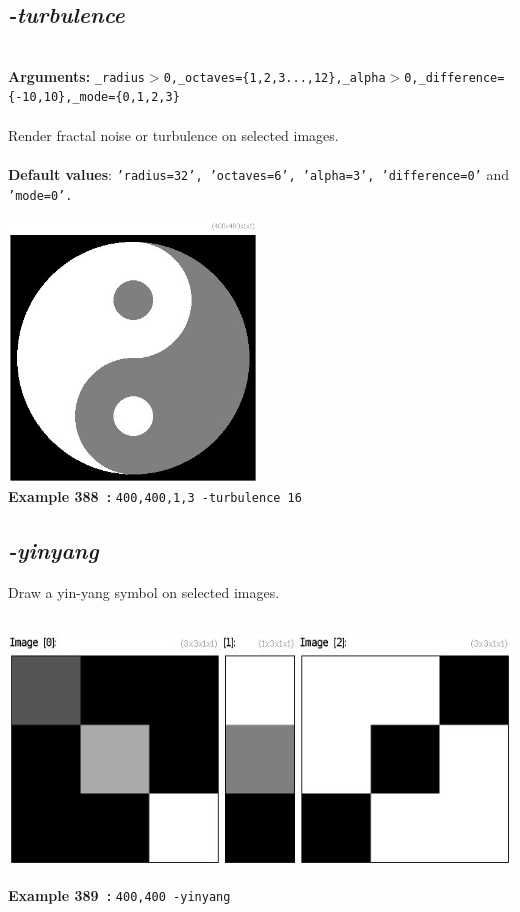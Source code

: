 \documentclass[a4paper,11pt,twoside]{book}
\begin{document}
\subsection{\emph{-turbulence} }\vspace*{-0.5em}
~\\\textbf{Arguments: } 
{\small \texttt{\_radius$>$0,\_octaves=\{1,2,3...,12\},\_alpha$>$0,\_difference=\{-10,10\},\_mode=\{0,1,2,3\}}}\\~\\
Render fractal noise or turbulence on selected images.
~\\~\\\textbf{Default values}: {\small \texttt{'radius=32', 'octaves=6', 'alpha=3', 'difference=0'} and \texttt{'mode=0'.}}
\begin{center}\includegraphics[keepaspectratio=true,height=7cm,width=\textwidth]{img/gmic_def388.jpg}\\
{\footnotesize \textbf{Example 388~:} \texttt{400,400,1,3 -turbulence 16}}
\end{center}

\subsection{\emph{-yinyang} }\vspace*{-0.5em}
Draw a yin-yang symbol on selected images.
\begin{center}\includegraphics[keepaspectratio=true,height=7cm,width=\textwidth]{img/gmic_def389.jpg}\\
{\footnotesize \textbf{Example 389~:} \texttt{400,400 -yinyang}}
\end{center}
\end{document}
